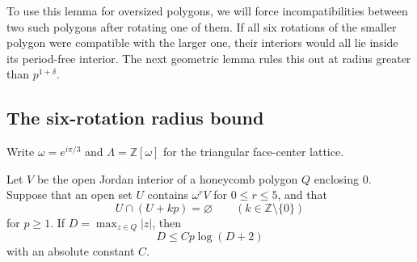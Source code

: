 To use this lemma for oversized polygons, we will force incompatibilities
between two such polygons after rotating one of them. If all six rotations
of the smaller polygon were compatible with the larger one, their interiors
would all lie inside its period-free interior. The next geometric lemma
rules this out at radius greater than \(p^{1+\delta}\).

\subsection{The six-rotation radius bound}

Write \(\omega=e^{i\pi/3}\) and \(\Lambda=\mathbb Z[\omega]\) for the
triangular face-center lattice.

\begin{lemma}\label{lem:pv:six-rotations}
Let \(V\) be the open Jordan interior of a honeycomb polygon \(Q\) enclosing
0. Suppose that an open set \(U\) contains \(\omega^rV\) for
\(0\le r\le5\), and that
\[
 U\cap(U+kp)=\varnothing\qquad(k\in\mathbb Z\setminus\{0\})
\]
for \(p\ge1\). If \(D=\max_{z\in Q}|z|\), then
\[
 D\le Cp\log(D+2)
\]
with an absolute constant \(C\).
\end{lemma}

